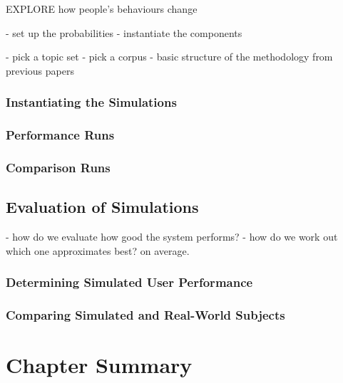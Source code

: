 EXPLORE how people's behaviours change

- set up the probabilities
- instantiate the components

- pick a topic set
- pick a corpus
- basic structure of the methodology from previous papers

\subsubsection{Instantiating the Simulations}

\subsubsection{Performance Runs}

\subsubsection{Comparison Runs}

\subsection{Evaluation of Simulations}\label{chap:csm:method:evaluation}
- how do we evaluate how good the system performs?
- how do we work out which one approximates best? on average.

\subsubsection{Determining Simulated User Performance}

\subsubsection{Comparing Simulated and Real-World Subjects}

\section{Chapter Summary}
